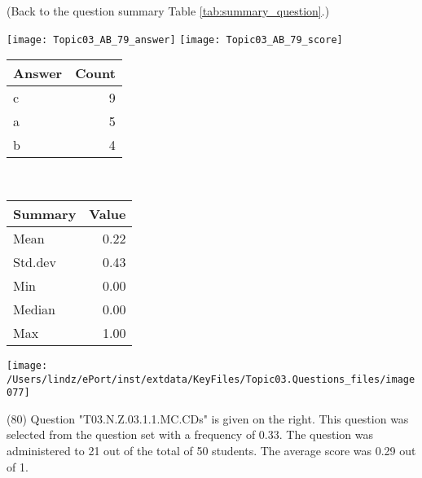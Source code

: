 \documentclass[12pt,english,nohyper]{tufte-handout}\usepackage[]{graphicx}\usepackage[]{color}
\begin{document}
 (Back to the question summary Table \ref{tab:summary_question}.)

\begin{center} \texttt{[image: Topic03\_AB\_79\_answer]} \texttt{[image: Topic03\_AB\_79\_score]} \end{center} 

\begin{center}%
\begin{tabular}{lr}
  \hline
Answer & Count \\ 
  \hline
c &   9 \\ 
  a &   5 \\ 
  b &   4 \\ 
   \hline
\end{tabular}
~~~~~~~~%
\begin{tabular}{lr}
  \hline
Summary & Value \\ 
  \hline
Mean & 0.22 \\ 
  Std.dev & 0.43 \\ 
  Min & 0.00 \\ 
  Median & 0.00 \\ 
  Max & 1.00 \\ 
   \hline
\end{tabular}
\end{center}\newpage{}



\vspace{6cm}\begin{marginfigure}\texttt{[image: /Users/lindz/ePort/inst/extdata/KeyFiles/Topic03.Questions\_files/image077]}\end{marginfigure}\vspace{-6cm} (80) Question "T03.N.Z.03.1.1.MC.CDs" is given on the right. This question was selected from the question set with a frequency of 0.33. The question was administered to 21 out of the total of 50 students. The average score was 0.29 out of 1.
\end{document}
